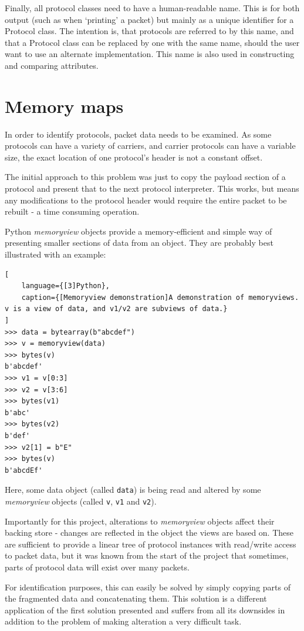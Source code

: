 \documentclass[10pt,a4paper,notitlepage]{report}
\begin{document}
Finally, all protocol classes need to have a human-readable name. This is for both output (such as when `printing' a packet) but mainly as a unique identifier for a Protocol class. The intention is, that protocols are referred to by this name, and that a Protocol class can be replaced by one with the same name, should the user want to use an alternate implementation. This name is also used in constructing and comparing attributes.

\pagebreak
\section{Memory maps}
\label{sec:memmap}
In order to identify protocols, packet data needs to be examined. As some protocols can have a variety of carriers, and carrier protocols can have a variable size, the exact location of one protocol's header is not a constant offset.

The initial approach to this problem was just to copy the payload section of a protocol and present that to the next protocol interpreter. This works, but means any modifications to the protocol header would require the entire packet to be rebuilt - a time consuming operation.

Python \emph{memoryview} objects provide a memory-efficient and simple way of presenting smaller sections of data from an object. They are probably best illustrated with an example:
\begin{lstlisting}[
	language={[3]Python},
   	caption={[Memoryview demonstration]A demonstration of memoryviews. v is a view of data, and v1/v2 are subviews of data.}
]
>>> data = bytearray(b"abcdef")
>>> v = memoryview(data)
>>> bytes(v)
b'abcdef'
>>> v1 = v[0:3]
>>> v2 = v[3:6]
>>> bytes(v1)
b'abc'
>>> bytes(v2)
b'def'
>>> v2[1] = b"E"
>>> bytes(v)
b'abcdEf'
\end{lstlisting}
Here, some data object (called \texttt{data}) is being read and altered by some \emph{memoryview} objects (called \texttt{v}, \texttt{v1} and \texttt{v2}).

Importantly for this project, alterations to \emph{memoryview} objects affect their backing store - changes are reflected in the object the views are based on. These are sufficient to provide a linear tree of protocol instances with read/write access to packet data, but it was known from the start of the project that sometimes, parts of protocol data will exist over many packets.

For identification purposes, this can easily be solved by simply copying parts of the fragmented data and concatenating them. This solution is a different application of the first solution presented and suffers from all its downsides in addition to the problem of making alteration a very difficult task.
\end{document}
